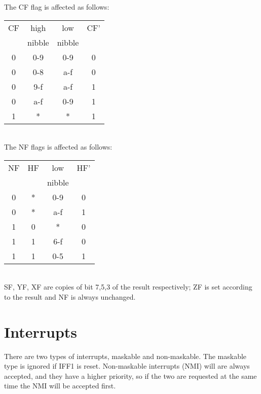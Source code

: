 \documentclass[oneside,a4paper]{book}
\begin{document}

The CF flag is affected as follows:

\begin{tabular}{c|c|c|c}
	CF & high   & low    & CF' \\
	& nibble & nibble &     \\ 	
	\hline
	0 & 0-9    & 0-9    &  0  \\
	0 & 0-8    & a-f    &  0  \\
	0 & 9-f    & a-f    &  1  \\
	0 & a-f    & 0-9    &  1  \\
	1 &  *     &  *     &  1  \\ 
	\hline
\end{tabular}\\[1ex]


The NF flags is affected as follows:
 
\begin{tabular}{c|c|c|c}
	NF & HF & low    & HF' \\
	&    & nibble &     \\ 
	\hline
	0 &  * & 0-9    &  0  \\
	0 &  * & a-f    &  1  \\
	1 &  0 &  *     &  0  \\
	1 &  1 & 6-f    &  0  \\
	1 &  1 & 0-5    &  1  \\ 
	\hline
\end{tabular}\\[1ex]


SF, YF, XF are copies of bit 7,5,3 of the result respectively; ZF is set according to the result and NF is always unchanged.




\chapter{Interrupts}
\label{interrupts}

There are two types of interrupts, maskable and non-maskable. The maskable type is ignored if IFF1 is reset. Non-maskable interrupts (NMI) will are always accepted, and they have a higher priority, so if the two are requested at the same time the NMI will be accepted first.
\end{document}

